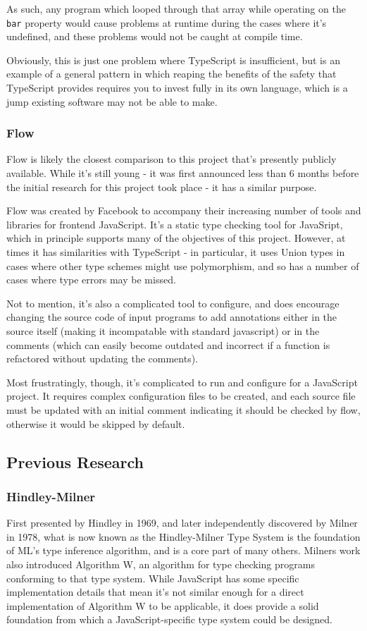 \documentclass[british, twoside]{bhamthesis}
\theoremstyle{definition}
\begin{document}
    As such, any program which looped through that array while operating on the \texttt {bar} property would cause problems at runtime during the cases where it's undefined, and these problems would not be caught at compile time.

    Obviously, this is just one problem where TypeScript is insufficient, but is an example of a general pattern in which reaping the benefits of the safety that TypeScript provides requires you to invest fully in its own language, which is a jump existing software may not be able to make.

  \subsubsection{Flow}
    Flow is likely the closest comparison to this project that's presently publicly available. While it's still young - it was first announced less than 6 months before the initial research for this project took place - it has a similar purpose.

    Flow was created by Facebook to accompany their increasing number of tools and libraries for frontend JavaScript. It's a static type checking tool for JavaSript, which in principle supports many of the objectives of this project. However, at times it has similarities with TypeScript - in particular, it uses Union types in cases where other type schemes might use polymorphism, and so has a number of cases where type errors may be missed.

    Not to mention, it's also a complicated tool to configure, and does encourage changing the source code of input programs to add annotations either in the source itself (making it incompatable with standard javascript) or in the comments (which can easily become outdated and incorrect if a function is refactored without updating the comments).

    Most frustratingly, though, it's complicated to run and configure for a JavaScript project. It requires complex configuration files to be created, and each source file must be updated with an initial comment indicating it should be checked by flow, otherwise it would be skipped by default.

  \subsection{Previous Research}

    \subsubsection{Hindley-Milner}
      First presented by Hindley in 1969, and later independently discovered by Milner in 1978, what is now known as the Hindley-Milner Type System is the foundation of ML's type inference algorithm, and is a core part of many others\autocite{Hindley1969}. Milners work also introduced Algorithm W, an algorithm for type checking programs conforming to that type system\autocite{Milner1978}. While JavaScript has some specific implementation details that mean it's not similar enough for a direct implementation of Algorithm W to be applicable, it does provide a solid foundation from which a JavaScript-specific type system could be designed.
\end{document}
